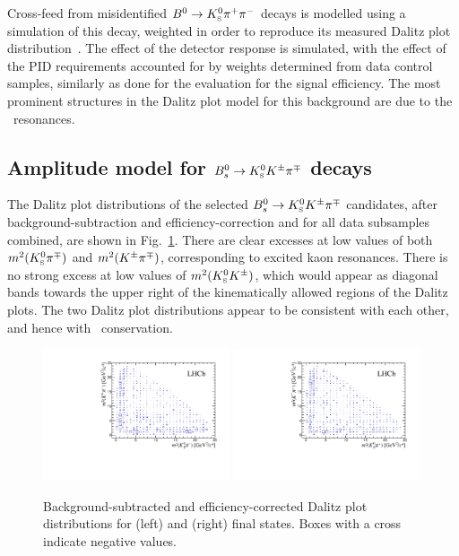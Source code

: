 Cross-feed from misidentified ${{B}^0}\rightarrow{\ensuremath{{K}^0_{\mathrm{ \scriptscriptstyle S}}}}{\ensuremath{{\pi}^+}}{\ensuremath{{\pi}^-}}$ decays is modelled using a simulation of this decay, weighted in order to reproduce its measured Dalitz plot distribution~\cite{Aubert:2009me}.
The effect of the detector response is simulated, with the effect of the PID requirements accounted for by weights determined from data control samples, similarly as done for the evaluation for the signal efficiency.  
The most prominent structures in the Dalitz plot model for this background are due to the \KstarIpm\ resonances.

\subsection{Amplitude model for ${{B}^0_{s}} \rightarrow {\ensuremath{{K}^0_{\mathrm{ \scriptscriptstyle S}}}}{\ensuremath{{K}^\pm}}{\ensuremath{{\pi}^\mp}}$ decays} 

The Dalitz plot distributions of the selected ${{B}^0_{s}}\rightarrow{\ensuremath{{K}^0_{\mathrm{ \scriptscriptstyle S}}}}{\ensuremath{{K}^\pm}}{\ensuremath{{\pi}^\mp}}$ candidates, after background-subtraction and efficiency-correction and for all data subsamples combined, are shown in Fig.~\ref{fig:dp-distribution}.
There are clear excesses at low values of both $m^2({{K}^0_{\mathrm{ \scriptscriptstyle S}}}{{\pi}^\mp})$ and $m^2({{K}^\pm}{{\pi}^\mp})$, corresponding to excited kaon resonances.
There is no strong excess at low values of $m^2({{K}^0_{\mathrm{ \scriptscriptstyle S}}}{{K}^\pm})$, which would appear as diagonal bands towards the upper right of the kinematically allowed regions of the Dalitz plots.
The two Dalitz plot distributions appear to be consistent with each other, and hence with \CP\ conservation.

\begin{figure}[!tb]
  \begin{center}
    \includegraphics*[width=0.49\textwidth]{figs/DP_Bs2KSKpi}
    \includegraphics*[width=0.49\textwidth]{figs/DP_Bs2KSpiK}
  \end{center}
\caption{\small
  Background-subtracted and efficiency-corrected Dalitz plot distributions for (left) \KsKpPim and (right) \KsKmPip final states. 
  Boxes with a cross indicate negative values.
  }
  \label{fig:dp-distribution}
\end{figure}

